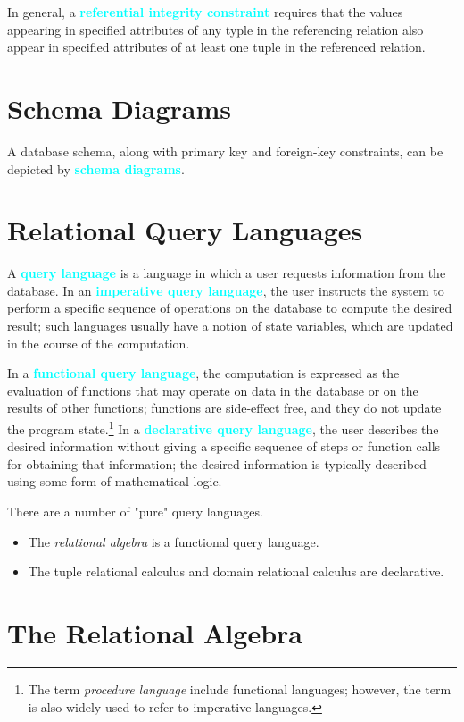 \documentclass{Beautybook-EN}
\newcommand{\textcy}[1]{\textbf{\textcolor{cyan}{#1}}}
\begin{document}
In general, a \textcy{referential integrity constraint} requires that the values appearing in specified attributes of any typle in the referencing relation also appear in specified attributes of at least one tuple in the referenced relation.

\section{Schema Diagrams}

A database schema, along with primary key and foreign-key constraints, can be depicted by \textcy{schema diagrams}.

\section{Relational Query Languages}

A \textcy{query language} is a language in which a user requests information from the database. In an \textcy{imperative query language}, the user instructs the system to perform a specific sequence of operations on the database to compute the desired result; such languages usually have a notion of state variables, which are updated in the course of the computation.

In a \textcy{functional query language}, the computation is expressed as the evaluation of functions that may operate on data in the database or on the results of other functions; functions are side-effect free, and they do not update the program state.\footnote{The term \textit{procedure language} include functional languages; however, the term is also widely used to refer to imperative languages.} In a \textcy{declarative query language}, the user describes the desired information without giving a specific sequence of steps or function calls for obtaining that information; the desired information is typically described using some form of mathematical logic.

There are a number of "pure" query languages.
\begin{itemize}
    \item The \textit{relational algebra} is a functional query language.
    \item The tuple relational calculus and domain relational calculus are declarative.
\end{itemize}

\section{The Relational Algebra}
\end{document}
